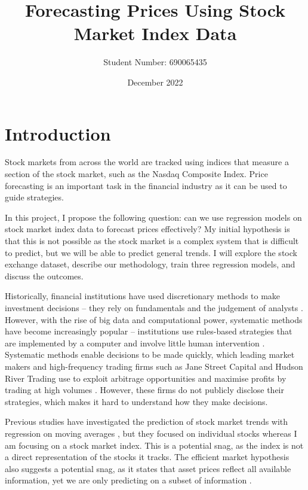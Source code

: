 \documentclass[a4paper, 11pt]{article}
\begin{document}
\title{Forecasting Prices Using Stock Market Index Data}
\author{Student Number: 690065435}
\date{December 2022}
\maketitle

\section{Introduction}
Stock markets from across the world are tracked using indices that measure a section of the stock market, such as the Nasdaq Composite Index. Price forecasting is an important task in the financial industry as it can be used to guide strategies.

In this project, I propose the following question: can we use regression models on stock market index data to forecast prices effectively? My initial hypothesis is that this is not possible as the stock market is a complex system that is difficult to predict, but we will be able to predict general trends. I will explore the stock exchange dataset, describe our methodology, train three regression models, and discuss the outcomes.

Historically, financial institutions have used discretionary methods to make investment decisions -- they rely on fundamentals and the judgement of analysts \cite{harvey2017man}. However, with the rise of big data and computational power, systematic methods have become increasingly popular -- institutions use rules-based strategies that are implemented by a computer and involve little human intervention \cite{harvey2017man}. Systematic methods enable decisions to be made quickly, which leading market makers and high-frequency trading firms such as Jane Street Capital and Hudson River Trading use to exploit arbitrage opportunities and maximise profits by trading at high volumes \cite{aldridge2013high}. However, these firms do not publicly disclose their strategies, which makes it hard to understand how they make decisions.

Previous studies have investigated the prediction of stock market trends with regression on moving averages \cite{dinesh2021prediction}, but they focused on individual stocks whereas I am focusing on a stock market index. This is a potential snag, as the index is not a direct representation of the stocks it tracks. The efficient market hypothesis also suggests a potential snag, as it states that asset prices reflect all available information, yet we are only predicting on a subset of information \cite{fama1970efficient}. 
\end{document}
